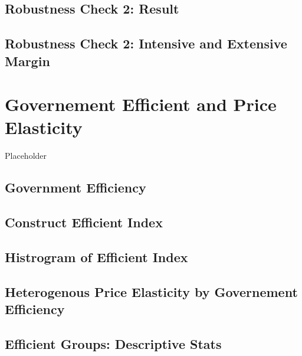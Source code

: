 \documentclass[ review  , 3p ]{elsarticle}
\begin{document}
  \hypertarget{robustness-check-2-result}{%
  \subsection{Robustness Check 2: Result}\label{robustness-check-2-result}}
  
  \hypertarget{robustness-check-2-intensive-and-extensive-margin}{%
  \subsection{Robustness Check 2: Intensive and Extensive Margin}\label{robustness-check-2-intensive-and-extensive-margin}}
  
  \hypertarget{governement-efficient-and-price-elasticity}{%
  \section{Governement Efficient and Price Elasticity}\label{governement-efficient-and-price-elasticity}}
  
  Placeholder
  
  \hypertarget{government-efficiency}{%
  \subsection{Government Efficiency}\label{government-efficiency}}
  
  \hypertarget{construct-efficient-index}{%
  \subsection{Construct Efficient Index}\label{construct-efficient-index}}
  
  \hypertarget{histrogram-of-efficient-index}{%
  \subsection{Histrogram of Efficient Index}\label{histrogram-of-efficient-index}}
  
  \hypertarget{heterogenous-price-elasticity-by-governement-efficiency}{%
  \subsection{Heterogenous Price Elasticity by Governement Efficiency}\label{heterogenous-price-elasticity-by-governement-efficiency}}
  
  \hypertarget{efficient-groups-descriptive-stats}{%
  \subsection{Efficient Groups: Descriptive Stats}\label{efficient-groups-descriptive-stats}}
  
\end{document}
